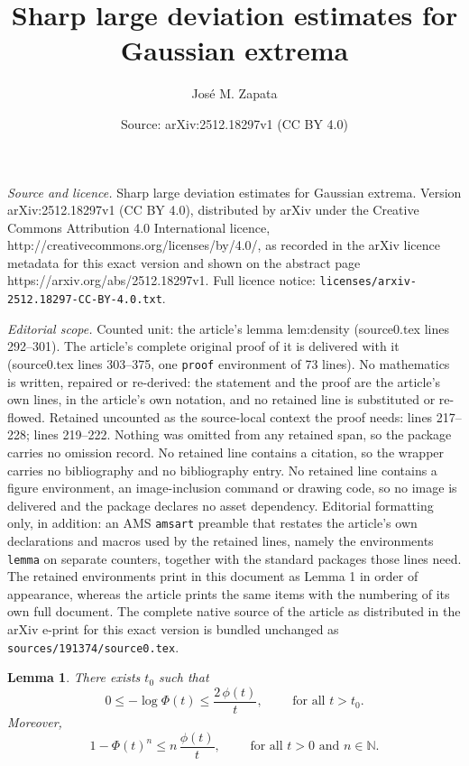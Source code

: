 \documentclass[10pt,a4paper]{amsart}
\title{Sharp large deviation estimates for Gaussian extrema}
\author{Jos\'e M. Zapata}
\date{Source: arXiv:2512.18297v1 (CC BY 4.0)}
\newtheorem{lemma}{Lemma}
\begin{document}
\maketitle

\noindent\emph{Source and licence.} Sharp large deviation estimates for Gaussian extrema. Version arXiv:2512.18297v1 (CC BY 4.0), distributed by arXiv under the Creative Commons Attribution 4.0 International licence, http://creativecommons.org/licenses/by/4.0/, as recorded in the arXiv licence metadata for this exact version and shown on the abstract page https://arxiv.org/abs/2512.18297v1. Full licence notice: \texttt{licenses/arxiv-2512.18297-CC-BY-4.0.txt}.\par\smallskip

\noindent\textit{Editorial scope.} Counted unit: the article's lemma lem:density (source0.tex lines 292--301). The article's complete original proof of it is delivered with it (source0.tex lines 303--375, one \texttt{proof} environment of 73 lines). No mathematics is written, repaired or re-derived: the statement and the proof are the article's own lines, in the article's own notation, and no retained line is substituted or re-flowed.  Retained uncounted as the source-local context the proof needs: lines 217--228; lines 219--222.  Nothing was omitted from any retained span, so the package carries no omission record.  No retained line contains a citation, so the wrapper carries no bibliography and no bibliography entry.  No retained line contains a figure environment, an image-inclusion command or drawing code, so no image is delivered and the package declares no asset dependency.  Editorial formatting only, in addition: an AMS \texttt{amsart} preamble that restates the article's own declarations and macros used by the retained lines, namely the environments \texttt{lemma} on separate counters, together with the standard packages those lines need.  The retained environments print in this document as Lemma 1 in order of appearance, whereas the article prints the same items with the numbering of its own full document.  The complete native source of the article as distributed in the arXiv e-print for this exact version is bundled unchanged as \texttt{sources/191374/source0.tex}.
\begin{lemma}\label{lem:ineqNormal}
There exists $t_0$ such that
\begin{equation}\label{eq:normalI}
0 \le -\log \Phi(t) \le \frac{2\,\phi(t)}{t},
\qquad \mbox{ for all }t>t_0.
\end{equation}
Moreover, 
\begin{equation}\label{eq:normalII}
1-\Phi(t)^n \le n\,\frac{\phi(t)}{t},
\qquad\mbox{ for all }t>0\mbox{ and }n\in\mathbb{N}.
\end{equation}
\end{lemma}
\end{document}
